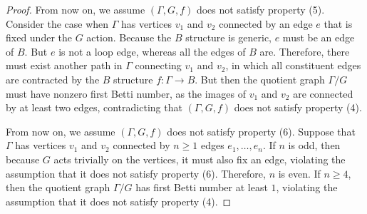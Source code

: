 \documentclass[10pt,a4paper]{amsart}
\begin{document}
\begin{proof}
    From now on, we assume $(\Gamma,G,f)$ does not satisfy property (5). Consider the case when $\Gamma$ has vertices $v_1$ and $v_2$ connected by an edge $e$ that is fixed under the $G$ action. Because the $B$ structure is generic, $e$ must be an edge of $B$. But $e$ is not a loop edge, whereas all the edges of $B$ are. Therefore, there must exist another path in $\Gamma$ connecting $v_1$ and $v_2$, in which all constituent edges are contracted by the $B$ structure $f:\Gamma\rightarrow B$. But then the quotient graph $\Gamma/G$ must have nonzero first Betti number, as the images of $v_1$ and $v_2$ are connected by at least two edges, contradicting that $(\Gamma,G,f)$ does not satisfy property (4).

    
    From now on, we assume $(\Gamma,G,f)$ does not satisfy property (6). Suppose that $\Gamma$ has vertices $v_1$ and $v_2$ connected by $n\geq 1$ edges $e_1,\dots,e_n$. If $n$ is odd, then because $G$ acts trivially on the vertices, it must also fix an edge, violating the assumption that it does not satisfy property (6). Therefore, $n$ is even. If $n\geq 4$, then the quotient graph $\Gamma/G$ has first Betti number at least $1$, violating the assumption that it does not satisfy property (4).

\end{proof}
\end{document}
